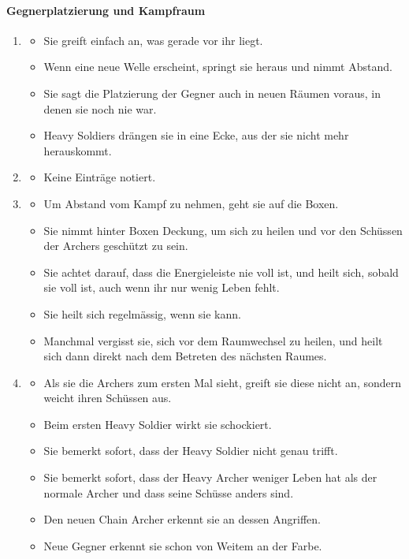 \documentclass[../Main.tex]{subfiles}
\begin{document}
\paragraph{Gegnerplatzierung und Kampfraum}
\begin{enumerate}[label=\textbf{B\arabic*}, leftmargin=1.5cm, itemsep=0.8em, resume]
    \item
        \begin{itemize}[nosep]
            \item Sie greift einfach an, was gerade vor ihr liegt.
            \item Wenn eine neue Welle erscheint, springt sie heraus und nimmt Abstand.
            \item Sie sagt die Platzierung der Gegner auch in neuen Räumen voraus, in denen sie noch nie war.
            \item Heavy Soldiers drängen sie in eine Ecke, aus der sie nicht mehr herauskommt.
        \end{itemize}
    \item
        \begin{itemize}[nosep]
            \item Keine Einträge notiert.
        \end{itemize}
    \item
        \begin{itemize}[nosep]
            \item Um Abstand vom Kampf zu nehmen, geht sie auf die Boxen.
            \item Sie nimmt hinter Boxen Deckung, um sich zu heilen und vor den Schüssen der Archers geschützt zu sein.
            \item Sie achtet darauf, dass die Energieleiste nie voll ist, und heilt sich, sobald sie voll ist, auch wenn ihr nur wenig Leben fehlt.
            \item Sie heilt sich regelmässig, wenn sie kann.
            \item Manchmal vergisst sie, sich vor dem Raumwechsel zu heilen, und heilt sich dann direkt nach dem Betreten des nächsten Raumes.
        \end{itemize}
    \item
        \begin{itemize}[nosep]
            \item Als sie die Archers zum ersten Mal sieht, greift sie diese nicht an, sondern weicht ihren Schüssen aus.
            \item Beim ersten Heavy Soldier wirkt sie schockiert.
            \item Sie bemerkt sofort, dass der Heavy Soldier nicht genau trifft.
            \item Sie bemerkt sofort, dass der Heavy Archer weniger Leben hat als der normale Archer und dass seine Schüsse anders sind.
            \item Den neuen Chain Archer erkennt sie an dessen Angriffen.
            \item Neue Gegner erkennt sie schon von Weitem an der Farbe.
        \end{itemize}
\end{enumerate}
\end{document}
